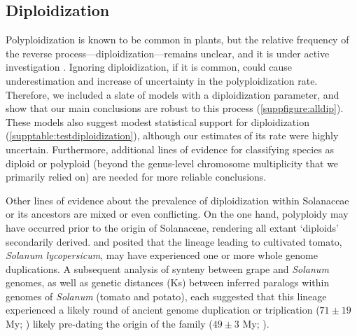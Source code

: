 
\subsection*{Diploidization}

Polyploidization is known to be common in plants, but the relative frequency of the reverse process---diploidization---remains unclear, and it is under active investigation \citep{dodsworth_2015,mandakova_2018}.
%
Ignoring diploidization, if it is common, could cause underestimation and increase of uncertainty in  the polyploidization rate. 
Therefore, we included a slate of models with a diploidization parameter, and show that our main conclusions are robust to this process (\cref{suppfigure:alldip}).
These models also suggest modest statistical support for diploidization (\cref{supptable:testdiploidization}), although our estimates of its rate were highly uncertain. 
Furthermore, additional lines of evidence for classifying species as diploid or polyploid (beyond the genus-level chromosome multiplicity that we primarily relied on) are needed for more reliable conclusions.

Other lines of evidence about the prevalence of diploidization within Solanaceae or its ancestors are mixed or even conflicting.
On the one hand, polyploidy may have occurred prior to the origin of Solanaceae, rendering all extant `diploids' secondarily derived.
 and \citet{blanc2004} posited that the lineage leading to cultivated tomato, \emph{Solanum lycopersicum}, may have experienced one or more whole genome duplications.
A subsequent analysis of synteny between grape and \emph{Solanum} genomes, as well as genetic distances (Ks) between inferred paralogs within genomes of \emph{Solanum} (tomato and potato), each suggested that this lineage experienced a likely round of ancient genome duplication or triplication ($71 \pm 19$ My; \citealt{tomato2012})  likely pre-dating the origin of the family ($49 \pm 3$ My; \citealt{sarkinen_2013}). 

